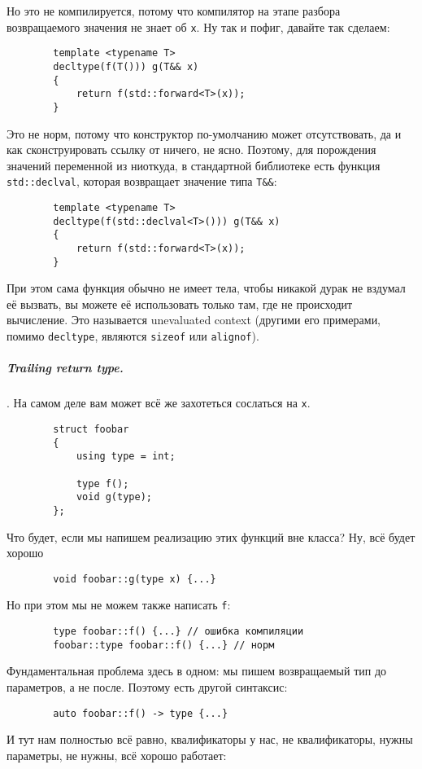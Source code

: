 \documentclass{article}
\begin{document}
    Но это не компилируется, потому что компилятор на этапе разбора возвращаемого значения не знает об \texttt{x}. Ну так и пофиг, давайте так сделаем:
    \begin{verbatim}
        template <typename T>
        decltype(f(T())) g(T&& x)
        {
            return f(std::forward<T>(x));
        }
    \end{verbatim}
    Это не норм, потому что конструктор по-умолчанию может отсутствовать, да и как сконструировать ссылку от ничего, не ясно. Поэтому, для порождения значений переменной из ниоткуда, в стандартной библиотеке есть функция \texttt{std::declval}, которая возвращает значение типа \texttt{T&&}:
    \begin{verbatim}
        template <typename T>
        decltype(f(std::declval<T>())) g(T&& x)
        {
            return f(std::forward<T>(x));
        }
    \end{verbatim}
    При этом сама функция обычно не имеет тела, чтобы никакой дурак не вздумал её вызвать, вы можете её использовать только там, где не происходит вычисление. Это называется unevaluated context (другими его примерами, помимо \texttt{decltype}, являются \texttt{sizeof} или \texttt{alignof}).
    \subparagraph{Trailing return type.}. На самом деле вам может всё же захотеться сослаться на \texttt{x}.
    \begin{verbatim}
        struct foobar
        {
            using type = int;
            
            type f();
            void g(type);
        };
    \end{verbatim}
    Что будет, если мы напишем реализацию этих функций вне класса? Ну, всё будет хорошо
    \begin{verbatim}
        void foobar::g(type x) {...}
    \end{verbatim}
    Но при этом мы не можем также написать \texttt{f}:
    \begin{verbatim}
        type foobar::f() {...} // ошибка компиляции
        foobar::type foobar::f() {...} // норм
    \end{verbatim}
    Фундаментальная проблема здесь в одном: мы пишем возвращаемый тип до параметров, а не после. Поэтому есть другой синтаксис:
    \begin{verbatim}
        auto foobar::f() -> type {...}
    \end{verbatim}
    И тут нам полностью всё равно, квалификаторы у нас, не квалификаторы, нужны параметры, не нужны, всё хорошо работает:
\end{document}

